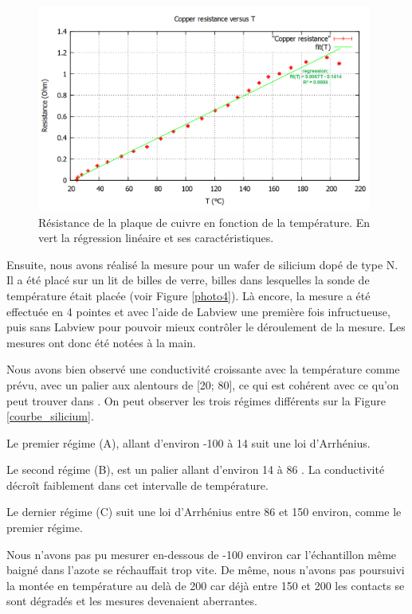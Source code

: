\begin{figure}[!b]
  \begin{center}
		\includegraphics[width=11cm]{./images/Resistance_Cuivre_finale_english.png}
		\caption{Résistance de la plaque de cuivre en fonction de la température. En vert la régression linéaire et ses caractéristiques.}
		\label{courbe_cuivre}
	\end{center}
\end{figure}

\newpage

Ensuite, nous avons réalisé la mesure pour un wafer de silicium dopé de type N. Il a été placé sur un lit de billes de verre, billes dans lesquelles la sonde de température était placée (voir Figure \ref{photo4}). Là encore, la mesure a été effectuée en 4 pointes et avec l'aide de Labview une première fois infructueuse, puis sans Labview pour pouvoir mieux contrôler le déroulement de la mesure. Les mesures ont donc été notées à la main.

Nous avons bien observé une conductivité croissante avec la température comme prévu, avec un palier aux alentours de [20\celsius{}; 80\celsius{}], ce qui est cohérent avec ce qu'on peut trouver dans \cite{kittel_introduction_1976}. On peut observer les trois régimes différents sur la Figure \ref{courbe_silicium}.

Le premier régime (A), allant d'environ -100 \celsius{} à 14 \celsius{} suit une loi d'Arrhénius.

Le second régime (B), est un palier allant d'environ 14 \celsius{} à 86 \celsius{}. La conductivité décroît faiblement dans cet intervalle de température.

Le dernier régime (C) suit une loi d'Arrhénius entre 86 \celsius{} et 150 \celsius{} environ, comme le premier régime.

Nous n'avons pas pu mesurer en-dessous de -100 \celsius{} environ car l'échantillon même baigné dans l'azote se réchauffait trop vite. De même, nous n'avons pas poursuivi la montée en température au delà de 200 \celsius{} car déjà entre 150 \celsius{} et 200 \celsius{} les contacts se sont dégradés et les mesures devenaient aberrantes.

